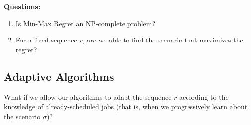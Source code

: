 \documentclass{article}
\begin{document}
\textbf{Questions:}
\begin{enumerate}
    \item Is Min-Max Regret an NP-complete problem?
    \item For a fixed sequence \(r\), are we able to find the scenario that maximizes the regret?
\end{enumerate}

\subsection{Adaptive Algorithms}

What if we allow our algorithms to adapt the sequence \(r\) according to the knowledge of already-scheduled jobs (that is, when we progressively learn about the scenario \(\sigma\))?



\end{document}
